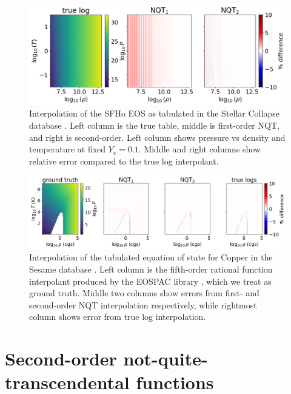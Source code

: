 \documentclass[linenumbers,twocolumn]{aastex631}
\begin{document}
\begin{figure}[p!]
    \centering
    \includegraphics[width=0.75\linewidth]{figures/stellarcollapsecomp.png}
    \caption{Interpolation of the SFHo EOS \citep{SFHoEOS} as tabulated in the Stellar Collapse database \citep{stellarcollapsetables}. Left column is the true table, middle is first-order NQT, and right is second-order. Left column shows pressure vs density and temperature at fixed $Y_e=0.1.$ Middle and right columns show relative error compared to the true log interpolant.}
    \label{fig:SFHo}
\end{figure}

\begin{figure}[p!]
    \centering
    \includegraphics[width=0.99\linewidth]{figures/sescomp.png}
    \caption{Interpolation of the tabulated equation of state for Copper in the Sesame database \citep{sesame,Peterson2012CopperEOS}. Left column is the fifth-order rational function interpolant produced by the EOSPAC library \citep{PimentelDavidA2021EUMV}, which we treat as ground truth. Middle two columns show errors from first- and second-order NQT interpolation respectively, while rightmost column shows error from true log interpolation.}
    \label{fig:copper}
\end{figure}

\section{Second-order not-quite-transcendental functions}
\label{sec:NQTo2}
\end{document}
